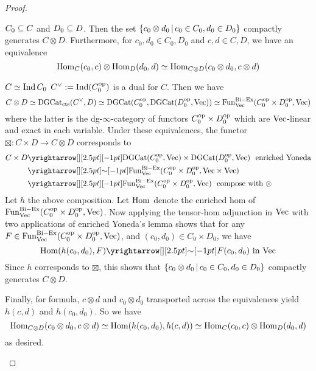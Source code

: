 \documentclass[./main.tex]{subfiles}
\begin{document}
\begin{proof}
\begin{lem}[GR1 Ch1 7.4.2]
    $C_0 \subseteq C$ and $D_0 \subseteq D$.
    Then the set $\left\{c_0 \otimes d_0 \,|\, c_0 \in C_0, d_0 \in D_0\right\}$ 
    compactly generates $C \otimes D$.
    Furthermore, 
    for $c_0, d_0 \in C_0, D_0$ and $c , d \in C , D$,
    we have an equivalence \[
      \mathrm{Hom}_C(c_0 , c) \otimes \mathrm{Hom}_D(d_0 , d) \simeq
      \mathrm{Hom}_{C \otimes D}(c_0 \otimes d_0 , c \otimes d)  
    \]
    \cite[Ch 1 , 7.4.2]{GR1}
    \begin{proof1}
      $C \simeq \mathrm{Ind}\,C_0$ 
      $C^\vee := \mathrm{Ind}(C_0^{\mathrm{op}})$ is a dual for $C$.
      Then we have \[
        C \otimes D \simeq \mathrm{DGCat}_{\mathrm{cts}}(C^\vee , D)
        \simeq \mathrm{DGCat}(C_0^{\mathrm{op}} , \mathrm{DGCat}(D_0^{\mathrm{op}} , \mathrm{Vec})) 
        \simeq \mathrm{Fun}^\mathrm{Bi-Ex}_{\mathrm{Vec}}(C_0^{\mathrm{op}} \times D_0^{\mathrm{op}} , \mathrm{Vec})
      \]
      where the latter is the dg-$\infty$-category of
      functors $C_0^{\mathrm{op}} \times D_0^{\mathrm{op}}$ which are $\mathrm{Vec}$-linear and exact
      in each variable.
      Under these equivalences, 
      the functor $\boxtimes : C \times D \to C \otimes D$ corresponds to
      \begin{align*}
        C \times D &\map{}{} 
        \DGCAT(C_0^\OP , \VEC) \times \DGCAT(D_0^\OP , \VEC) 
        \,\,\,\,\text{enriched Yoneda}\\
        &\map{\sim}{}
        \FUN^\mathrm{Bi-Ex}_\VEC(C_0^\OP \times D_0^\OP , \VEC \times \VEC)\\
        &\map{}{}
        \FUN^\mathrm{Bi-Ex}_\VEC(C_0^\OP \times D_0^\OP , \VEC)
        \,\,\,\,\text{compose with }\otimes
      \end{align*}
      Let $h$ the above composition.
      Let $\mathrm{Hom}$ denote the enriched hom of 
      $\mathrm{Fun}^\mathrm{Bi-Ex}_{\mathrm{Vec}}(C_0^{\mathrm{op}} \times D_0^{\mathrm{op}} , \mathrm{Vec})$.
      Now applying the tensor-hom adjunction in $\mathrm{Vec}$ with
      two applications of enriched Yoneda's lemma shows that
      for any $F \in 
      \mathrm{Fun}^\mathrm{Bi-Ex}_{\mathrm{Vec}}(C_0^{\mathrm{op}} \times D_0^{\mathrm{op}} , \mathrm{Vec})$,
      and $(c_0, d_0) \in C_0 \times D_0$, we have \[
        \HOM(h(c_0 , d_0) , F) \map{\sim}{} F(c_0 , d_0) \text{ in }\VEC
      \]
      Since $h$ corresponds to $\boxtimes$,
      this shows that $\left\{c_0 \otimes d_0 \,|\, c_0 \in C_0 , d_0 \in D_0\right\}$
      compactly generates $C \otimes D$.

      Finally, for formula,
      $c \otimes d$ and $c_0 \otimes d_0$ transported across
      the equivalences yield $h(c , d)$ and $h(c_0 , d_0)$.
      So we have \[
        \mathrm{Hom}_{C \otimes D}(c_0 \otimes d_0 , c \otimes d)
        \simeq \mathrm{Hom}(h(c_0 , d_0) , h(c , d))
        \simeq \mathrm{Hom}_C(c_0 , c) \otimes \mathrm{Hom}_D(d_0 , d)
      \]
      as desired.


\end{proof1}
\end{lem}
\end{proof}
\end{document}
